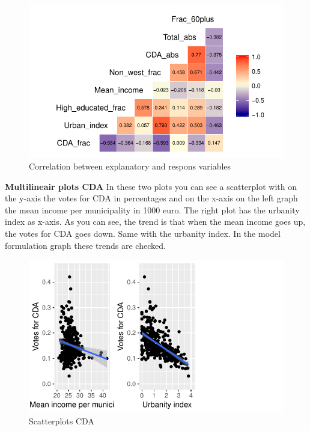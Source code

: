 \documentclass[11pt,]{article}
\begin{document}
\begin{figure}[H]

{\centering \includegraphics{Report_files/figure-latex/correlation_heatmap-1} 

}

\caption{\label{2}Correlation between explanatory and respons variables}\label{fig:correlation_heatmap}
\end{figure}

\textbf{Multilineair plots CDA } In these two plots you can see a
scatterplot with on the y-axis the votes for CDA in percentages and on
the x-axis on the left graph the mean income per municipality in 1000
euro. The right plot has the urbanity index as x-axis. As you can see,
the trend is that when the mean income goes up, the votes for CDA goes
down. Same with the urbanity index. In the model formulation graph these
trends are checked.

\begin{figure}[H]

{\centering \includegraphics{Report_files/figure-latex/unnamed-chunk-6-1} 

}

\caption{\label{3}Scatterplots CDA}\label{fig:unnamed-chunk-6}
\end{figure}
\end{document}
